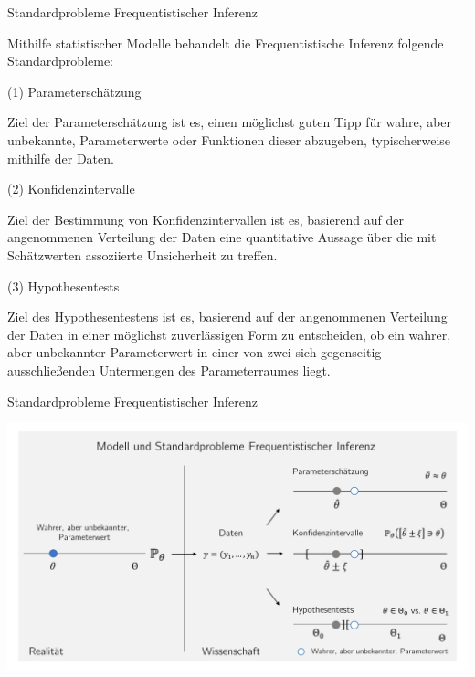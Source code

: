 \documentclass[
  8pt,
  ignorenonframetext,
]{beamer}
\begin{document}
\begin{frame}{Standardprobleme Frequentistischer Inferenz}
\protect\hypertarget{standardprobleme-frequentistischer-inferenz}{}
\small

Mithilfe statistischer Modelle behandelt die Frequentistische Inferenz
folgende Standardprobleme:

\vspace{2mm}

\noindent (1) Parameterschätzung

Ziel der Parameterschätzung ist es, einen möglichst guten Tipp für
wahre, aber unbekannte, Parameterwerte oder Funktionen dieser abzugeben,
typischerweise mithilfe der Daten.

\vspace{2mm}

\noindent (2) Konfidenzintervalle

Ziel der Bestimmung von Konfidenzintervallen ist es, basierend auf der
angenommenen Verteilung der Daten eine quantitative Aussage über die mit
Schätzwerten assoziierte Unsicherheit zu treffen.

\vspace{2mm}

\noindent (3) Hypothesentests

Ziel des Hypothesentestens ist es, basierend auf der angenommenen
Verteilung der Daten in einer möglichst zuverlässigen Form zu
entscheiden, ob ein wahrer, aber unbekannter Parameterwert in einer von
zwei sich gegenseitig ausschließenden Untermengen des Parameterraumes
liegt.
\end{frame}

\begin{frame}{Standardprobleme Frequentistischer Inferenz}
\protect\hypertarget{standardprobleme-frequentistischer-inferenz-1}{}
\begin{center}\includegraphics[width=1\linewidth]{9_Abbildungen/wtfi_9_frequentistische_inferenz} \end{center}
\end{frame}
\end{document}
